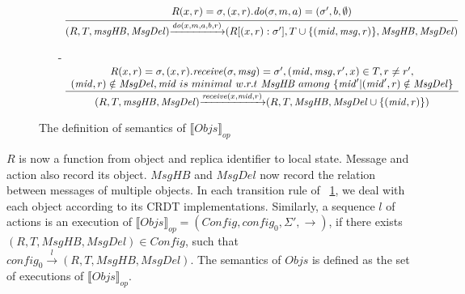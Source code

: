 {\begin{figure}[ht]
\begin{itemize}
\item[] $\begin{array}{l c}
   \bigfrac{
   \begin{array}{c}
     R(x,r) = \sigma, (x,r).\mathit{do}(\sigma,m,a) = (\sigma',b,\emptyset)
   \end{array}}
     {(R,T,\mathit{msgHB},\mathit{MsgDel}) {\xrightarrow{\mathit{do}(x,m,a,b,r)}} (R[(x,r):\sigma'], T \cup \{ (\mathit{mid},\mathit{msg},r) \}, \mathit{MsgHB},\mathit{MsgDel})}
\end{array}$

\item[-] $\begin{array}{l c}
   \bigfrac{
   \begin{array}{c}
      R(x,r) = \sigma, (x,r).\mathit{receive}(\sigma,\mathit{msg}) = \sigma', (\mathit{mid},\mathit{msg},r',x) \in T, r \neq r', \\
      (\mathit{mid},r) \notin \mathit{MsgDel}, \mathit{mid} \ is \ minimal \ w.r.t \ \mathit{MsgHB} \ among \ \{ \mathit{mid}' \vert (\mathit{mid}',r) \notin \mathit{MsgDel} \}
   \end{array}}
     {(R,T,\mathit{msgHB},\mathit{MsgDel}) {\xrightarrow{\mathit{receive}(x,\mathit{mid},r)}} (R,T,\mathit{MsgHB},\mathit{MsgDel} \cup \{ (\mathit{mid},r) \} )}
\end{array}$
\end{itemize}
\caption{The definition of semantics of $\llbracket \mathit{Objs} \rrbracket_{\mathit{op}}$}
\label{fig:the semantics of multiple operation-based CRDT object}
\end{figure}




$R$ is now a function from object and replica identifier to local state. Message and action also record its object. $\mathit{MsgHB}$ and $\mathit{MsgDel}$ now record the relation between messages of multiple objects. In each transition rule of \figurename~\ref{fig:the semantics of multiple operation-based CRDT object}, we deal with each object according to its CRDT implementations. Similarly, a sequence $l$ of actions is an execution of $\llbracket \mathit{Objs} \rrbracket_{\mathit{op}} = (\mathit{Config},\mathit{config}_0,\Sigma',\rightarrow)$, if there exists $(R,T,\mathit{MsgHB},\mathit{MsgDel}) \in \mathit{Config}$, such that $\mathit{config}_0 {\xrightarrow{ l }} (R,T,\mathit{MsgHB},\mathit{MsgDel})$. The semantics of $\mathit{Objs}$ is defined as the set of executions of $\llbracket \mathit{Objs} \rrbracket_{\mathit{op}}$.





}
